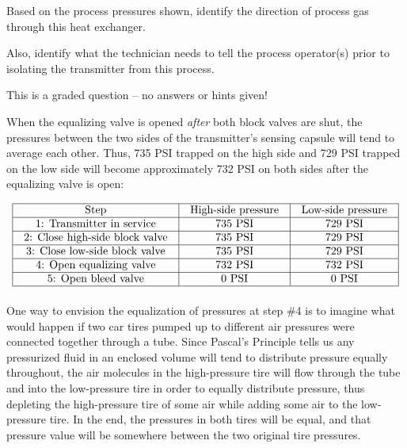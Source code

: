 Based on the process pressures shown, identify the direction of process gas through this heat exchanger.

\vskip 10pt

Also, identify what the technician needs to tell the process operator(s) prior to isolating the transmitter from this process.

\vfil

\eject






This is a graded question -- no answers or hints given!







When the equalizing valve is opened {\it after} both block valves are shut, the pressures between the two sides of the transmitter's sensing capsule will tend to average each other.  Thus, 735 PSI trapped on the high side and 729 PSI trapped on the low side will become approximately 732 PSI on both sides after the equalizing valve is open:


$$\vbox{\offinterlineskip
\halign{\strut
\vrule \quad\hfil # \ \hfil & 
\vrule \quad\hfil # \ \hfil & 
\vrule \quad\hfil # \ \hfil \vrule \cr
\noalign{\hrule}
%
Step & High-side pressure & Low-side pressure \cr
%
\noalign{\hrule}
%
1: Transmitter in service & 735 PSI & 729 PSI \cr
%
\noalign{\hrule}
%
2: Close high-side block valve & 735 PSI & 729 PSI \cr
%
\noalign{\hrule}
%
3: Close low-side block valve & 735 PSI & 729 PSI \cr
%
\noalign{\hrule}
%
4: Open equalizing valve & 732 PSI & 732 PSI \cr
%
\noalign{\hrule}
%
5: Open bleed valve & 0 PSI & 0 PSI \cr
%
\noalign{\hrule}
} %
}$$ %

One way to envision the equalization of pressures at step \#4 is to imagine what would happen if two car tires pumped up to different air pressures were connected together through a tube.  Since Pascal's Principle tells us any pressurized fluid in an enclosed volume will tend to distribute pressure equally throughout, the air molecules in the high-pressure tire will flow through the tube and into the low-pressure tire in order to equally distribute pressure, thus depleting the high-pressure tire of some air while adding some air to the low-pressure tire.  In the end, the pressures in both tires will be equal, and that pressure value will be somewhere between the two original tire pressures.

